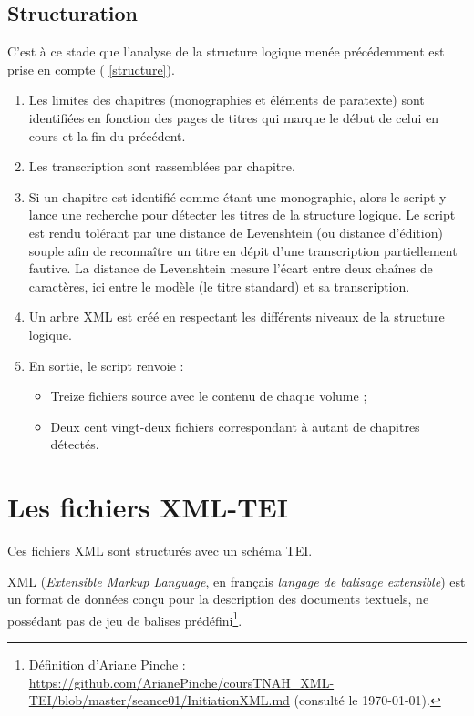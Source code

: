\subsection{Structuration}

C'est à ce stade que l'analyse de la structure logique menée précédemment est prise en compte (\ann{} \ref{structure}).

\begin{enumerate}
    \item Les limites des chapitres (monographies et éléments de paratexte) sont identifiées en fonction des pages de titres qui marque le début de celui en cours et la fin du précédent.
    \item Les transcription sont rassemblées par chapitre.
    \item Si un chapitre est identifié comme étant une monographie, alors le script y lance une recherche pour détecter les titres de la structure logique. Le script est rendu tolérant par une distance de Levenshtein (ou distance d'édition) souple afin de reconnaître un titre en dépit d'une transcription partiellement fautive. La distance de Levenshtein mesure l'écart entre deux chaînes de caractères, ici entre le modèle (le titre standard) et sa transcription.
    \item Un arbre XML est créé en respectant les différents niveaux de la structure logique.
    \item En sortie, le script renvoie :
    \begin{itemize}
        \item Treize fichiers \og source \fg{} avec le contenu de chaque volume ;
        \item Deux cent vingt-deux fichiers correspondant à autant de chapitres détectés.
    \end{itemize}
\end{enumerate}

\section{Les fichiers XML-TEI}

Ces fichiers XML sont structurés avec un schéma TEI.

XML (\textit{Extensible Markup Language}, en français \textit{langage de balisage extensible}) est un format de données conçu pour la description des documents textuels, ne possédant pas de jeu de balises prédéfini\footnote{Définition d'Ariane Pinche : \url{https://github.com/ArianePinche/coursTNAH_XML-TEI/blob/master/seance01/InitiationXML.md} (consulté le \today).}.


